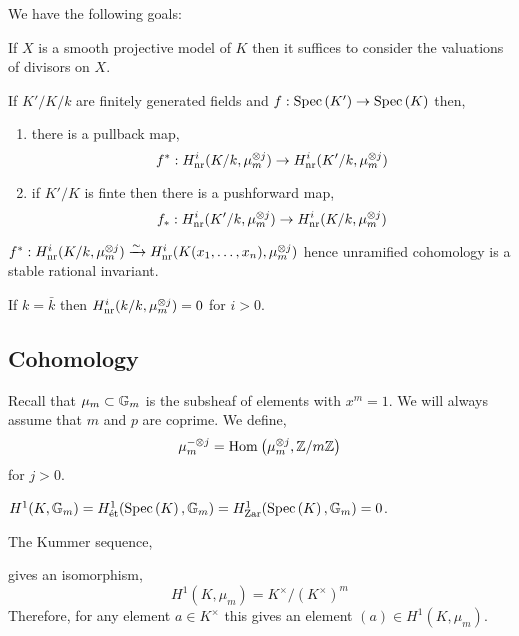 \documentclass[12pt]{article}
\begin{document}
We have the following goals:

\begin{theorem}
If $X$ is a smooth projective model of $K$ then it suffices to consider the valuations of divisors on $X$.
\end{theorem}

\begin{prop}
If $K' / K / k$ are finitely generated fields and $f : \mathrm{Spec}\left( K' \right) \to \mathrm{Spec}\left( K \right)$ then,
\begin{enumerate}
\item there is a pullback map,
\[ f^* : H_{\mathrm{nr}}^i(K/k, \mu_m^{\otimes j}) \to H_{\mathrm{nr}}^i(K'/k, \mu_m^{\otimes j}) \]
\item if $K' / K$ is finte then there is a pushforward map,
\[ f_* : H_{\mathrm{nr}}^i(K'/k, \mu_m^{\otimes j}) \to H_{\mathrm{nr}}^i(K / k, \mu_m^{\otimes j}) \]
\end{enumerate}
\end{prop}

\begin{prop}
$f^* : H^i_{\mathrm{nr}}(K/k, \mu_m^{\otimes j}) \xrightarrow{\sim} H^i_{\mathrm{nr}}(K(x_1, \dots, x_n), \mu_m^{\otimes j})$
hence unramified cohomology is a stable rational invariant.
\end{prop}

\begin{rmk}
If $k = \bar{k}$ then $H^i_{\mathrm{nr}}(k/k, \mu_m^{\otimes j}) = 0$ for $i > 0$.
\end{rmk}

\subsection{\etale Cohomology}

Recall that $\mu_m \subset {\mathbb{G}_m}$ is the subsheaf of elements with $x^m = 1$. We will always assume that $m$ and $p$ are coprime. We define,
\[ \mu_m^{-\otimes j} = \mathrm{Hom}_{} \left( \mu^{\otimes j}_m, \mathbb{Z} / m \mathbb{Z} \right) \]
for $j > 0$.

\begin{theorem}[Hilbert 90]
$H^1(K, {\mathbb{G}_m}) = H^1_{\text{\'{e}t}}(\mathrm{Spec}\left( K \right), {\mathbb{G}_m}) = H^1_{\text{Zar}}(\mathrm{Spec}\left( K \right), {\mathbb{G}_m}) = 0$.
\end{theorem}

\begin{cor}
The Kummer sequence,
\begin{center}
\end{center}
gives an isomorphism,
\[ H^1(K, \mu_m) = K^\times / (K^\times)^m \]
Therefore, for any element $a \in K^\times$ this gives an element $(a) \in H^1(K, \mu_{m})$.
\end{cor}
\end{document}

